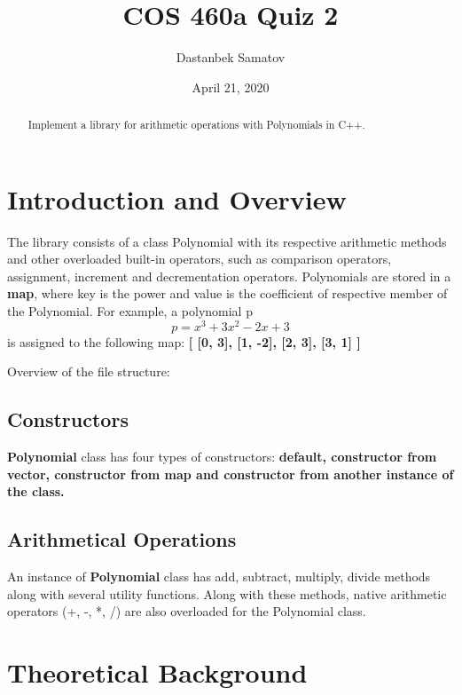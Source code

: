\documentclass{article}
\title{COS 460a Quiz 2}
\author{Dastanbek Samatov}
\date{April 21, 2020}
\begin{document}
\maketitle

\begin{abstract}
    Implement a library for arithmetic operations with Polynomials in C++.
\end{abstract}

\section{Introduction and Overview}

The library consists of a class Polynomial with its respective arithmetic methods and
other overloaded built-in operators, such as comparison operators, assignment, 
increment and decrementation operators. Polynomials are stored in a \textbf{map}, where
key is the power and value is the coefficient of respective member of the Polynomial.
For example, a polynomial p 
\begin{equation}
    p = x^3 + 3x^2 - 2x + 3 
\end{equation}
is assigned to the following map: \textbf{[ [0, 3], [1, -2], [2, 3], [3, 1] ]}

Overview of the file structure:
\subsection{Constructors}
\textbf{Polynomial} class has four types of constructors: \textbf{default, constructor from 
vector, constructor from map and constructor from another instance of the class.}

\subsection{Arithmetical Operations}
An instance of \textbf{Polynomial} class has add, subtract, multiply, divide methods along
with several utility functions. Along with these methods, native arithmetic 
operators (+, -, *, /) are also overloaded for the Polynomial class.

\section{Theoretical Background}
\end{document}
